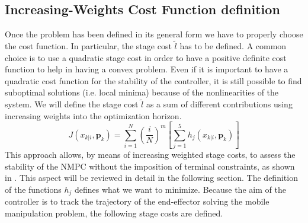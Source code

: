 \subsection{Increasing-Weights Cost Function definition}

Once the problem has been defined in its general form we have to properly choose the cost function. In particular, the stage cost $\tilde{l}$ has to be defined. A common choice is to use a quadratic stage cost in order to have a positive definite cost function to help in having a convex problem. Even if it is important to have a quadratic cost function for the stability of the controller, it is still possible to find suboptimal solutions (i.e. local minima) because of the nonlinearities of the system. We will define the stage cost $\tilde{l}$ as a sum of different contributions using increasing weights into the optimization horizon. 
\begin{equation}\label{costfunctionh}
J({x}_{k|i},\textbf{p}_k)=\sum_{i=1}^{N}\left(\frac{i}{N}\right)^m \left[ \sum_{j=1}^{5} h_j({x}_{k|i},\textbf{p}_k) \right]
\end{equation} 
This approach allows, by means of increasing weighted stage costs, to assess the stability of the NMPC without the imposition of terminal constraints, as shown in \cite{alamir2018stability}. This aspect will be reviewed in detail in the following section.
The definition of the functions $h_j$ defines what we want to minimize. Because the aim of the controller is to track the trajectory of the end-effector solving the mobile manipulation problem, the following stage costs are defined.
